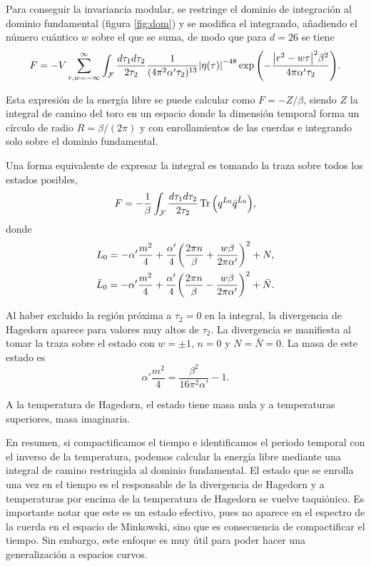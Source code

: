 Para conseguir la invariancia modular, se restringe el dominio de integración al dominio
fundamental (figura \ref{fig:dom}) y se modifica el integrando, añadiendo el número cuántico $w$ sobre el que 
se suma, de modo que para $d=26$ se tiene
\begin{equation}
  F=-V \sum_{r,w=-\infty}^{\infty} \int_\mathcal{F}  \frac{d\tau_1d\tau_2}{2\tau_2}   \frac{1}{(4\pi^2\alpha'\tau_2)^{13}}
  \abs{\eta(\tau)}^{-48}\exp\qty(-\frac{\abs{r^2-w\tau}^2\beta^2}{4\pi\alpha'\tau_2}).
  \label{eq:fund}
\end{equation}

Esta expresión de la energía libre se puede calcular como $F=-Z/\beta$, siendo $Z$ la integral de camino del toro en
un espacio donde la dimensión temporal forma un círculo de radio $R=\beta/(2\pi)$ y con enrollamientos
de las cuerdas e integrando solo sobre el dominio fundamental.

Una forma equivalente de expresar la integral es tomando la traza sobre todos los estados posibles,
\begin{equation}
  F =-\frac{1}{\beta} \int_{\mathcal F} \frac{d\tau_1 d\tau_2}{2\tau_2} \Tr\qty(q^{L_0} \bar q^{\bar L_0}),
\end{equation}
donde 
\begin{equation}
  \begin{gathered}
         L_0 =  -\alpha'\frac{m^2}{4} + \frac{\alpha'}{4}\qty(\frac{2\pi n}{\beta} + \frac{w\beta}{2\pi\alpha'})^2 + N,\\
    \bar L_0 =  -\alpha'\frac{m^2}{4} + \frac{\alpha'}{4}\qty(\frac{2\pi n}{\beta} - \frac{w\beta}{2\pi\alpha'})^2 +\bar N.
  \end{gathered}
\end{equation}

Al haber excluido la región próxima a $\tau_2=0$ en la integral, la divergencia de Hagedorn aparece para
valores muy altos de $\tau_2$.
La divergencia se manifiesta al tomar la traza sobre el estado con $w=\pm 1$, $n=0$ y $N=\bar N=0$.
La masa de este estado es
\begin{equation}
  \alpha' \frac{m^2}{4} = \frac{\beta^2}{16\pi^2\alpha'} -1.
\end{equation}

A la temperatura de Hagedorn, el estado tiene masa nula y a temperaturas superiores, masa
imaginaria.

En resumen, si compactificamos el tiempo e identificamos el periodo temporal con el inverso de la
temperatura, podemos calcular la energía libre mediante una integral de camino restringida
al dominio fundamental.
El estado que se enrolla una vez en el tiempo es el responsable de la divergencia de Hagedorn y
a temperaturas por encima de la temperatura de Hagedorn se vuelve taquiónico.
Es importante notar que este es un estado efectivo, pues no aparece en el espectro de la cuerda en 
el espacio de Minkowski, sino que es consecuencia de compactificar el tiempo.
Sin embargo, este enfoque es muy útil para poder hacer una generalización a espacios curvos.
